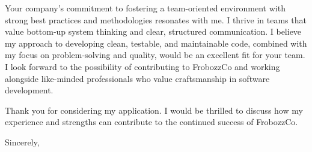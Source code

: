 \documentclass[10pt]{letter}
\begin{document}
\begin{letter}{}
    Your company’s commitment to fostering a team-oriented environment with strong best practices and methodologies resonates with me. I thrive in teams that value bottom-up system thinking and clear, structured communication. I believe my approach to developing clean, testable, and maintainable code, combined with my focus on problem-solving and quality, would be an excellent fit for your team. I look forward to the possibility of contributing to FrobozzCo and working alongside like-minded professionals who value craftsmanship in software development.
    
    Thank you for considering my application. I would be thrilled to discuss how my experience and strengths can contribute to the continued success of FrobozzCo.
    
\closing{Sincerely,}

\end{letter}
\end{document}
